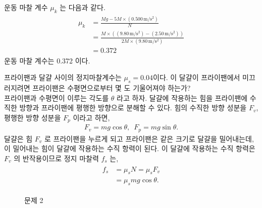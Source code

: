 \documentclass[floatfix,nofootinbib,superscriptaddress,fleqn]{revtex4-2}
\begin{document}
운동 마찰 계수 $\mu_k$ 는 다음과 같다.
\begin{align}
  \begin{split}
    \mu_k &= \frac{Mg - 5M \times (0.500\,\mathrm{m/s^2})}{N} \\
    &= \frac{M\times((9.80\,\mathrm{m/s^2})-(2.50\,\mathrm{m/s^2}))}
    {2M\times(9.80\,\mathrm{m/s^2})}  \\
    &= 0.372
  \end{split}
\end{align}
운동 마찰 계수는 0.372 이다.


\vspace{2cm}

 프라이팬과 달걀 사이의 정지마찰계수는
$\mu_s=0.04$이다. 이 달걀이 프라이팬에서 미끄러지려면 프라이팬은
수평면으로부터 몇 도 기울어져야 하는가?  \\


프라이팬과 수평면이 이루는 각도를 $\theta$ 라고 하자. 달걀에 작용하는 힘을
프라이팬에 수직한 방향과 프라이팬에 평행한 방향으로 분해할 수 있다. 힘의 수직한
방향 성분을 $F_v$, 평행한 방향 성분을 $F_p$ 이라고 하면,
\begin{align}
F_v = mg\cos{\theta},\,\,\,F_p = mg\sin{\theta}  .
\end{align}
달걀은 힘 $F_v$ 로 프라이팬을 누르게 되고 프라이팬은 같은 크기로 달걀을 밀어내는데,
이 밀어내는 힘이 달걀에 작용하는 수직 항력이 된다.
이 달걀에 작용하는 수직 항력은 $F_v$ 의 반작용이므로 정지 마찰력 $f_s$ 는,
\begin{align}
  \begin{split}
    f_s &= \mu_s N = \mu_s F_v \\
    &= \mu_s mg\cos{\theta}.
  \end{split}
\end{align} 

\begin{figure}[htp]
   \caption{문제 2}
\end{figure}
\end{document}

